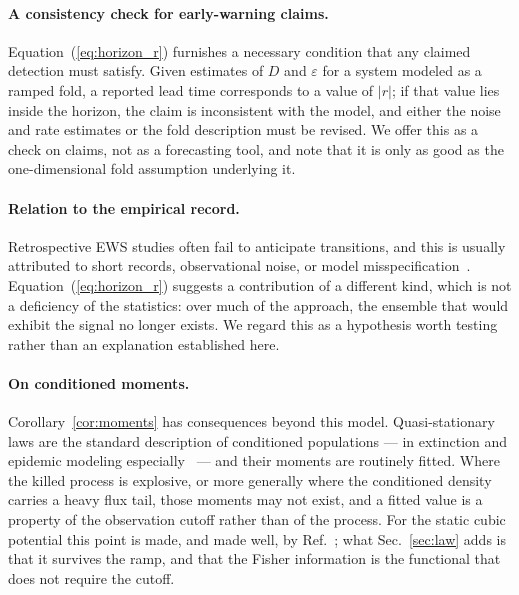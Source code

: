 \documentclass[%
 aip,
 cha,
 amsmath,amssymb,
 reprint,
 superscriptaddress,
 floatfix,
]{revtex4-2}
\begin{document}
\paragraph{A consistency check for early-warning claims.}
Equation~(\ref{eq:horizon_r}) furnishes a necessary condition that any claimed detection must satisfy.  Given estimates of $D$ and $\varepsilon$ for a system modeled as a ramped fold, a reported lead time corresponds to a value of $|r|$; if that value lies inside the horizon, the claim is inconsistent with the model, and either the noise and rate estimates or the fold description must be revised.  We offer this as a check on claims, not as a forecasting tool, and note that it is only as good as the one-dimensional fold assumption underlying it.

\paragraph{Relation to the empirical record.}
Retrospective EWS studies often fail to anticipate transitions, and this is usually attributed to short records, observational noise, or model misspecification~\cite{Dakos2024,Boettiger2012}.  Equation~(\ref{eq:horizon_r}) suggests a contribution of a different kind, which is not a deficiency of the statistics: over much of the approach, the ensemble that would exhibit the signal no longer exists.  We regard this as a hypothesis worth testing rather than an explanation established here.

\paragraph{On conditioned moments.}
Corollary~\ref{cor:moments} has consequences beyond this model.  Quasi-stationary laws are the standard description of conditioned populations --- in extinction and epidemic modeling especially~\cite{MeleardVillemonais2012,Collet2013} --- and their moments are routinely fitted.  Where the killed process is explosive, or more generally where the conditioned density carries a heavy flux tail, those moments may not exist, and a fitted value is a property of the observation cutoff rather than of the process.  For the static cubic potential this point is made, and made well, by Ref.~\cite{Ornigotti2018}; what Sec.~\ref{sec:law} adds is that it survives the ramp, and that the Fisher information is the functional that does not require the cutoff.
\end{document}
